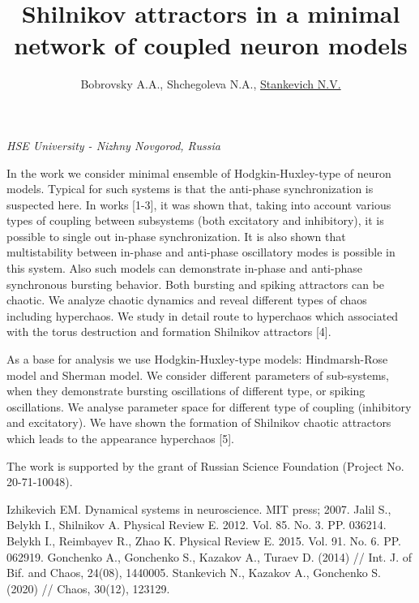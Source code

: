 \documentclass[12pt]{article}
\title{\bf\Large Shilnikov attractors in a minimal network of coupled neuron models}
\author{Bobrovsky A.A., Shchegoleva N.A., \underline{Stankevich N.V.}}
\date{}
\begin{document}
	
\begin{center}
	\maketitle
	{\large\textit{HSE University - Nizhny Novgorod, Russia}}
\end{center}

In the work we consider minimal ensemble of Hodgkin-Huxley-type of neuron models. Typical for such systems is that the anti-phase synchronization is suspected here. In works [1-3], it was shown that, taking into account various types of coupling between subsystems (both excitatory and inhibitory), it is possible to single out in-phase synchronization. It is also shown that multistability between in-phase and anti-phase oscillatory modes is possible in this system. Also such models can demonstrate in-phase and anti-phase synchronous bursting behavior. Both bursting and spiking attractors can be chaotic. We analyze chaotic dynamics and reveal different types of chaos including hyperchaos. We study in detail route to hyperchaos which associated with the torus destruction and formation Shilnikov attractors [4]. 

As a base for analysis we use Hodgkin-Huxley-type models: Hindmarsh-Rose model and Sherman model. We consider different parameters of sub-systems, when they demonstrate bursting oscillations of different type, or spiking oscillations. We analyse parameter space for different type of coupling (inhibitory and excitatory). We have shown the formation of Shilnikov chaotic attractors which leads to the appearance hyperchaos [5].

The work is supported by the grant of Russian Science Foundation (Project No. 20-71-10048).

\begin{thebibliography}{99}
     Izhikevich EM. Dynamical systems in neuroscience. MIT press; 2007.
     Jalil S., Belykh I., Shilnikov A. Physical Review E. 2012. Vol. 85. No. 3. PP. 036214.
	 Belykh I., Reimbayev R., Zhao K. Physical Review E. 2015. Vol. 91. No. 6. PP. 062919.
	 Gonchenko A., Gonchenko S., Kazakov A., Turaev D. (2014) // Int. J. of Bif. and Chaos, 24(08), 1440005.
	 Stankevich N., Kazakov A., Gonchenko S. (2020) // Chaos, 30(12), 123129.
	
\end{thebibliography}
\end{document}
